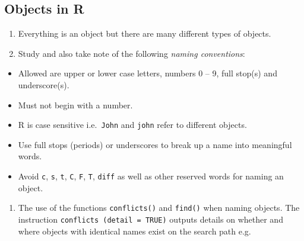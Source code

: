 \documentclass[
]{book}
\newenvironment{Shaded}{\begin{snugshade}}{\end{snugshade}}
\newcommand{\AttributeTok}[1]{\textcolor[rgb]{0.13,0.29,0.53}{#1}}
\newcommand{\CommentTok}[1]{\textcolor[rgb]{0.56,0.35,0.01}{\textit{#1}}}
\newcommand{\ConstantTok}[1]{\textcolor[rgb]{0.56,0.35,0.01}{#1}}
\newcommand{\FunctionTok}[1]{\textcolor[rgb]{0.13,0.29,0.53}{\textbf{#1}}}
\newcommand{\NormalTok}[1]{#1}
\providecommand{\tightlist}{%
  \setlength{\itemsep}{0pt}\setlength{\parskip}{0pt}}
\begin{document}
\subsection{Objects in R}\label{objects-in-r}

\begin{enumerate}
\def\labelenumi{(\alph{enumi})}
\item
  Everything is an object but there are many different types of objects.
\item
  Study and also take note of the following \emph{{naming conventions}}:
\end{enumerate}

\begin{itemize}
\tightlist
\item
  Allowed are upper or lower case letters, numbers 0 -- 9, full stop(s) and underscore(s).
\item
  Must not begin with a number.
\item
  R is case sensitive i.e.~\texttt{John} and \texttt{john} refer to different objects.
\item
  Use full stops (periods) or underscores to break up a name into meaningful words.
\item
  Avoid \texttt{c}, \texttt{s}, \texttt{t}, \texttt{C}, \texttt{F}, \texttt{T}, \texttt{diff} as well as other reserved words for naming an object.
\end{itemize}

\begin{enumerate}
\def\labelenumi{(\alph{enumi})}
\setcounter{enumi}{2}
\tightlist
\item
  The use of the functions \texttt{conflicts()} and \texttt{find()} when naming objects. The instruction \texttt{conflicts\ (detail\ =\ TRUE)} outputs details on whether and where objects with identical names exist on the search path e.g.
\end{enumerate}

\begin{Shaded}
\end{Shaded}
\end{document}
